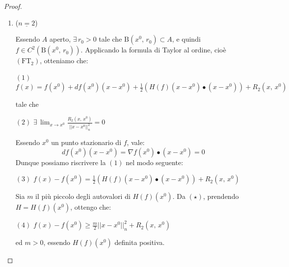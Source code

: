 \begin{proof}
\begin{enumerate}[labelindent=\parindent,leftmargin=*,label=\textnormal{(\roman*)},start=1]
\item ($\underline{n=2}$)\\
\begin{center}
\def\svgwidth{8cm}

\end{center}
Essendo $A$ aperto, $\exists \, r_0 > 0$ tale che $\mathrm{B}(x^0,\,r_0) \subset A$, e quindi $f \in C^2 \left( \mathrm{B}(x^0,\,r_0) \right)$. Applicando la formula di Taylor al  ordine, cioè $\mathrm{(FT_2)}$, otteniamo che:
\begin{center}
$\mathrm{(1)}$
\hfill
$\displaystyle
f(x) = f(x^0) + df(x^0)(x-x^0) + \frac{1}{2} \left( H(f)(x-x^0) \bullet (x-x^0) \right) + R_2(x,\,x^0)
$
\hfill \null \\
\end{center}
tale che
\begin{center}
$\mathrm{(2)}$
\hfill
$\displaystyle
\exists \, \lim_{x \rightarrow x^0} \frac{R_2(x,\,x^0)}{||x-x^0||_n^2} = 0
$
\hfill \null \\
\end{center}
Essendo $x^0$ un punto stazionario di $f$, vale:
$$
df(x^0)(x-x^0) = \nabla f(x^0) \bullet (x-x^0) = 0
$$
Dunque possiamo riscrivere la $\mathrm{(1)}$ nel modo seguente:
\begin{center}
$\mathrm{(3)}$
\hfill
$\displaystyle
f(x) - f(x^0) = \frac{1}{2} \left( H(f)(x-x^0) \bullet (x-x^0) \right) + R_2(x,\,x^0)
$
\hfill \null \\
\end{center}
Sia $m$ il più piccolo degli autovalori di $H(f)(x^0)$. Da $\mathrm{(\star)}$, prendendo $H = H(f)(x^0)$, ottengo che:
\begin{center}
$\mathrm{(4)}$
\hfill
$\displaystyle
f(x) - f(x^0) \geq \frac{m}{2} ||x-x^0||_n^2 + R_2(x,\,x^0)
$
\hfill \null \\
\end{center}
ed $ m > 0$, essendo $H(f)(x^0)$ definita positiva.


\end{enumerate}
\end{proof}

